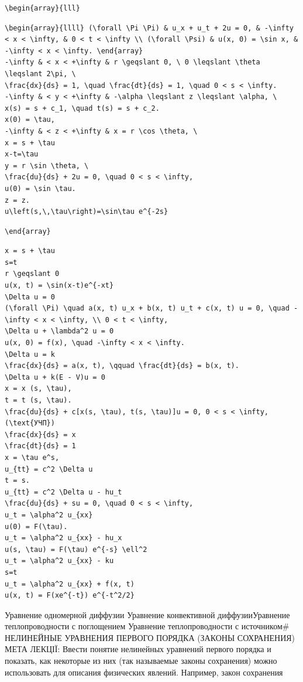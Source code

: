 \documentclass[
  ukrainian,
]{article}
\begin{document}
\begin{verbatim}
\begin{array}{lll}
\end{verbatim}

\begin{verbatim}
\begin{array}{llll} (\forall \Pi \Pi) & u_x + u_t + 2u = 0, & -\infty < x < \infty, & 0 < t < \infty \\ (\forall \Psi) & u(x, 0) = \sin x, & -\infty < x < \infty. \end{array}
-\infty & < x < +\infty & r \geqslant 0, \ 0 \leqslant \theta \leqslant 2\pi, \
\frac{dx}{ds} = 1, \quad \frac{dt}{ds} = 1, \quad 0 < s < \infty.
-\infty & < y < +\infty & -\alpha \leqslant z \leqslant \alpha, \
x(s) = s + c_1, \quad t(s) = s + c_2.
x(0) = \tau,
-\infty & < z < +\infty & x = r \cos \theta, \
x = s + \tau
x-t=\tau
y = r \sin \theta, \
\frac{du}{ds} + 2u = 0, \quad 0 < s < \infty,
u(0) = \sin \tau.
z = z.
u\left(s,\,\tau\right)=\sin\tau e^{-2s}
\end{verbatim}

\begin{verbatim}
\end{array}
\end{verbatim}

\begin{verbatim}
x = s + \tau
s=t
r \geqslant 0
u(x, t) = \sin(x-t)e^{-xt}
\Delta u = 0
(\forall \Pi) \quad a(x, t) u_x + b(x, t) u_t + c(x, t) u = 0, \quad -\infty < x < \infty, \\ 0 < t < \infty,
\Delta u + \lambda^2 u = 0
u(x, 0) = f(x), \quad -\infty < x < \infty.
\Delta u = k
\frac{dx}{ds} = a(x, t), \qquad \frac{dt}{ds} = b(x, t).
\Delta u + k(E - V)u = 0
x = x (s, \tau),
t = t (s, \tau).
\frac{du}{ds} + c[x(s, \tau), t(s, \tau)]u = 0, 0 < s < \infty,
(\text{УЧП})
\frac{dx}{ds} = x
\frac{dt}{ds} = 1
x = \tau e^s,
u_{tt} = c^2 \Delta u
t = s.
u_{tt} = c^2 \Delta u - hu_t
\frac{du}{ds} + su = 0, \quad 0 < s < \infty,
u_t = \alpha^2 u_{xx}
u(0) = F(\tau).
u_t = \alpha^2 u_{xx} - hu_x
u(s, \tau) = F(\tau) e^{-s} \ell^2
u_t = \alpha^2 u_{xx} - ku
s=t
u_t = \alpha^2 u_{xx} + f(x, t)
u(x, t) = F(xe^{-t}) e^{-t^2/2}
\end{verbatim}

Уравнение одномерной диффузии Уравнение конвективной диффузииУравнение
теплопроводности с поглощением Уравнение теплопроводности с источником\#
НЕЛИНЕЙНЫЕ УРАВНЕНИЯ ПЕРВОГО ПОРЯДКА (ЗАКОНЫ СОХРАНЕНИЯ) МЕТА ЛЕКЦІЇ:
Ввести понятие нелинейных уравнений первого порядка и показать, как
некоторые из них (так называемые законы сохранения) можно использовать
для описания физических явлений. Например, закон сохранения
\end{document}
